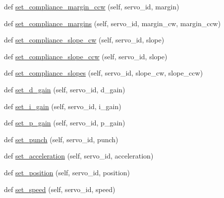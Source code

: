 \begin{DoxyCompactItemize}
def \hyperlink{classdynamixel__driver_1_1dynamixel__io_1_1_dynamixel_i_o_a9bccd126d83bf078e1879d7f0819be74}{set\+\_\+compliance\+\_\+margin\+\_\+ccw} (self, servo\+\_\+id, margin)
\item 
def \hyperlink{classdynamixel__driver_1_1dynamixel__io_1_1_dynamixel_i_o_a63bf7eefaada9a1a9d8b17dd33d88f90}{set\+\_\+compliance\+\_\+margins} (self, servo\+\_\+id, margin\+\_\+cw, margin\+\_\+ccw)
\item 
def \hyperlink{classdynamixel__driver_1_1dynamixel__io_1_1_dynamixel_i_o_a2592528e6dc31c08e36f40b2bb8712e7}{set\+\_\+compliance\+\_\+slope\+\_\+cw} (self, servo\+\_\+id, slope)
\item 
def \hyperlink{classdynamixel__driver_1_1dynamixel__io_1_1_dynamixel_i_o_a367bdf6bff310866e082962ec6b62ee2}{set\+\_\+compliance\+\_\+slope\+\_\+ccw} (self, servo\+\_\+id, slope)
\item 
def \hyperlink{classdynamixel__driver_1_1dynamixel__io_1_1_dynamixel_i_o_a861b5b920bdd922f787d5f7a335c583d}{set\+\_\+compliance\+\_\+slopes} (self, servo\+\_\+id, slope\+\_\+cw, slope\+\_\+ccw)
\item 
def \hyperlink{classdynamixel__driver_1_1dynamixel__io_1_1_dynamixel_i_o_a0047f1e442b7db44b6c85f4695384ffc}{set\+\_\+d\+\_\+gain} (self, servo\+\_\+id, d\+\_\+gain)
\item 
def \hyperlink{classdynamixel__driver_1_1dynamixel__io_1_1_dynamixel_i_o_a3d65dc76f96e3c11e2319a1dd79e85dd}{set\+\_\+i\+\_\+gain} (self, servo\+\_\+id, i\+\_\+gain)
\item 
def \hyperlink{classdynamixel__driver_1_1dynamixel__io_1_1_dynamixel_i_o_aaf22ae60cdc22b26bc6b1fb3f8c87197}{set\+\_\+p\+\_\+gain} (self, servo\+\_\+id, p\+\_\+gain)
\item 
def \hyperlink{classdynamixel__driver_1_1dynamixel__io_1_1_dynamixel_i_o_a71006ce4b2eed14fbf7189813b168086}{set\+\_\+punch} (self, servo\+\_\+id, punch)
\item 
def \hyperlink{classdynamixel__driver_1_1dynamixel__io_1_1_dynamixel_i_o_a493890484a67a377cb462c5ad58217e5}{set\+\_\+acceleration} (self, servo\+\_\+id, acceleration)
\item 
def \hyperlink{classdynamixel__driver_1_1dynamixel__io_1_1_dynamixel_i_o_a9fe99ffb450e3d2df5a4ffe188a74c27}{set\+\_\+position} (self, servo\+\_\+id, position)
\item 
def \hyperlink{classdynamixel__driver_1_1dynamixel__io_1_1_dynamixel_i_o_add7657922014d85bd52aeb1f0d9d2d41}{set\+\_\+speed} (self, servo\+\_\+id, speed)
\item 

\end{DoxyCompactItemize}

